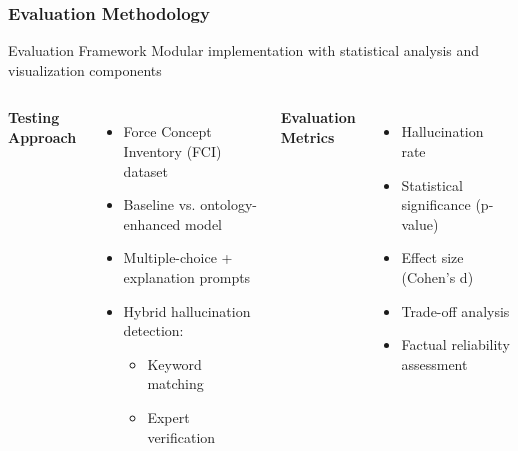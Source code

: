 \documentclass{beamer}
\begin{document}
\begin{frame}
\frametitle{Evaluation Methodology}

\begin{alertblock}{Evaluation Framework}
Modular implementation with statistical analysis and visualization components
\end{alertblock}

\begin{columns}

\textbf{Testing Approach}
\begin{itemize}
    \item Force Concept Inventory (FCI) dataset
    \item Baseline vs. ontology-enhanced model
    \item Multiple-choice + explanation prompts
    \item Hybrid hallucination detection:
    \begin{itemize}
        \item Keyword matching
        \item Expert verification
    \end{itemize}
\end{itemize}

\textbf{Evaluation Metrics}
\begin{itemize}
    \item Hallucination rate
    \item Statistical significance (p-value)
    \item Effect size (Cohen's d)
    \item Trade-off analysis
    \item Factual reliability assessment
\end{itemize}

\end{columns}
\end{frame}
\end{document}
